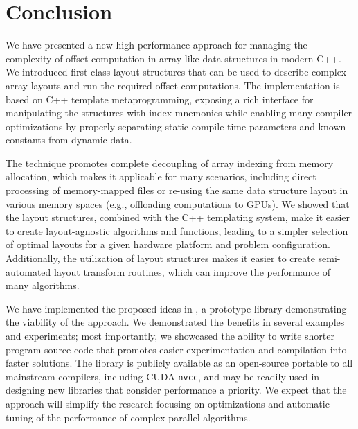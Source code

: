 
%

% 




\section{Conclusion}\label{sec:conclusion}

We have presented a new high-performance approach for managing the complexity of offset computation in array-like data structures in modern C++. We introduced first-class layout structures that can be used to describe complex array layouts and run the required offset computations. The implementation is based on C++ template metaprogramming, exposing a rich interface for manipulating the structures with index mnemonics while enabling many compiler optimizations by properly separating static compile-time parameters and known constants from dynamic data.

The technique promotes complete decoupling of array indexing from memory allocation, which makes it applicable for many scenarios, including direct processing of memory-mapped files or re-using the same data structure layout in various memory spaces (e.g., offloading computations to GPUs). We showed that the layout structures, combined with the C++ templating system, make it easier to create layout-agnostic algorithms and functions, leading to a simpler selection of optimal layouts for a given hardware platform and problem configuration. Additionally, the utilization of layout structures makes it easier to create semi-automated layout transform routines, which can improve the performance of many algorithms.

We have implemented the proposed ideas in \Noarr{}, a prototype library demonstrating the viability of the approach. We demonstrated the benefits in several examples and experiments; most importantly, we showcased the ability to write shorter program source code that promotes easier experimentation and compilation into faster solutions. The library is publicly available as an open-source portable to all mainstream compilers, including CUDA \texttt{nvcc}, and may be readily used in designing new libraries that consider performance a priority. We expect that the approach will simplify the research focusing on optimizations and automatic tuning of the performance of complex parallel algorithms.






